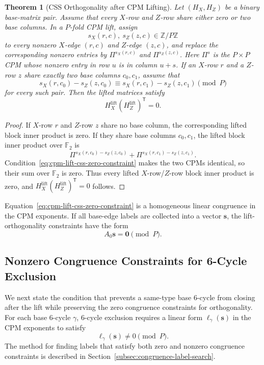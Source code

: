 \documentclass[11pt,a4paper]{article}
\newcommand{\F}{\mathbb{F}}
\newcommand{\HX}{H_X}
\newcommand{\HZ}{H_Z}
\newcommand{\HXL}{H_X^{\mathrm{lift}}}
\newcommand{\HZL}{H_Z^{\mathrm{lift}}}
\theoremstyle{uprighttheorem}
\newtheorem{theorem}{Theorem}
\begin{document}
\begin{theorem}[CSS Orthogonality after CPM Lifting]\label{thm:cpm-lift-css-orthogonality}
Let \((\HX,\HZ)\) be a binary base-matrix pair.
Assume that every \(X\)-row and \(Z\)-row share either zero or two base columns.
In a \(P\)-fold CPM lift, assign
\[
  s_X(r,c),\ s_Z(z,c)\in\mathbb Z/P\mathbb Z
\]
to every nonzero \(X\)-edge \((r,c)\) and \(Z\)-edge \((z,c)\), and replace the corresponding nonzero entries by \(\Pi^{s_X(r,c)}\) and \(\Pi^{s_Z(z,c)}\).
Here \(\Pi^s\) is the \(P\times P\) CPM whose nonzero entry in row \(u\) is in column \(u+s\).
If an \(X\)-row \(r\) and a \(Z\)-row \(z\) share exactly two base columns \(c_0,c_1\), assume that
\begin{equation}
\label{eq:cpm-lift-css-zero-constraint}
  s_X(r,c_0)-s_Z(z,c_0)
  \equiv
  s_X(r,c_1)-s_Z(z,c_1)
  \pmod P
\end{equation}
for every such pair.
Then the lifted matrices satisfy
\[
  \HXL(\HZL)^{\mathsf T}=0 .
\]
\end{theorem}

\begin{proof}
If \(X\)-row \(r\) and \(Z\)-row \(z\) share no base column, the corresponding lifted block inner product is zero.
If they share base columns \(c_0,c_1\), the lifted block inner product over \(\F_2\) is
\[
  \Pi^{s_X(r,c_0)-s_Z(z,c_0)}
  +
  \Pi^{s_X(r,c_1)-s_Z(z,c_1)} .
\]
Condition~\eqref{eq:cpm-lift-css-zero-constraint} makes the two CPMs identical, so their sum over \(\F_2\) is zero.
Thus every lifted \(X\)-row/\(Z\)-row block inner product is zero, and \(\HXL(\HZL)^{\mathsf T}=0\) follows.
\end{proof}

Equation~\eqref{eq:cpm-lift-css-zero-constraint} is a homogeneous linear congruence in the CPM exponents.
If all base-edge labels are collected into a vector \(\bm s\), the lift-orthogonality constraints have the form
\[
  A_0\bm s=\bm 0\pmod P .
\]

\subsection{Nonzero Congruence Constraints for 6-Cycle Exclusion}\label{subsec:cpm-lift-six-cycle-exclusion}

We next state the condition that prevents a same-type base 6-cycle from closing after the lift while preserving the zero congruence constraints for orthogonality.
For each base 6-cycle \(\gamma\), 6-cycle exclusion requires a linear form \(\ell_\gamma(\bm s)\) in the CPM exponents to satisfy
\[
  \ell_\gamma(\bm s)\ne0\pmod P .
\]
The method for finding labels that satisfy both zero and nonzero congruence constraints is described in Section~\ref{subsec:congruence-label-search}.
\end{document}
